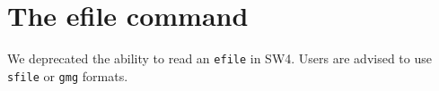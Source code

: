 \documentclass[11pt]{report}
\begin{document}
{\section{The efile command} \label{sec:efile}
We deprecated the ability to read an \verb+efile+ in SW4. Users are advised to use \verb+sfile+ or \verb+gmg+ formats.
}
\end{document}
